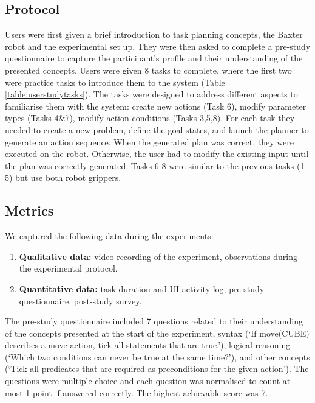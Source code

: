 \subsection{Protocol}
Users were first given a brief introduction to task planning concepts, the Baxter robot and the experimental set up.
They were then asked to complete a pre-study questionnaire to capture the participant's profile and their understanding of the presented concepts.
Users were given 8 tasks to complete, where the first two were practice tasks to introduce them to the system (Table \ref{table:userstudytasks}). 
The tasks were designed to address different aspects to familiarise them with the system:
create new actions (Task 6), modify parameter types (Tasks 4\&7), modify action conditions (Tasks 3,5,8).
For each task they needed to create a new problem, define the goal states, and launch the planner to generate an action sequence.
When the generated plan was correct, they were executed on the robot.
Otherwise, the user had to modify the existing input until the plan was correctly generated.
Tasks 6-8 were similar to the previous tasks (1-5) but use both robot grippers.

\subsection{Metrics}
We captured the following data during the experiments:
\begin{enumerate}
    \item \textbf{Qualitative data:} video recording of the experiment, observations during the experimental protocol.
    \item \textbf{Quantitative data:} task duration and UI activity log, pre-study questionnaire, post-study survey.
\end{enumerate}

The pre-study questionnaire included 7 questions related to their understanding of the concepts presented at the start of the experiment, \eg syntax (`If move(CUBE) describes a move action, tick all statements that are true.'), logical reasoning 
(`Which two conditions can never be true at the same time?'), and other concepts (`Tick all predicates that are required as preconditions for the given action').
The questions were multiple choice and each question was normalised to count at most 1 point if answered correctly.
The highest achievable score was 7.

